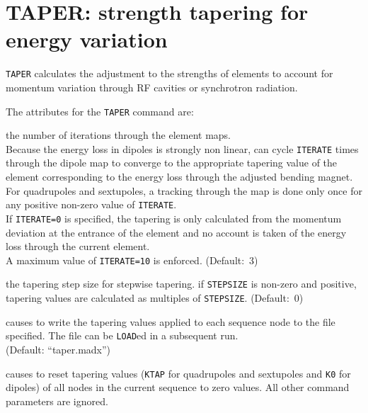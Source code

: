 
\chapter{TAPER: strength tapering for energy variation}
\label{chap:taper}

\texttt{TAPER} calculates the adjustment to the strengths of elements to
account for momentum variation through RF cavities or synchrotron
radiation. 


The attributes for the \texttt{TAPER} command are: 
\begin{madlist}
   the number of iterations through the element maps. \\
  Because the energy loss in dipoles is strongly non linear, \madx
  can cycle \texttt{ITERATE} times through the dipole map to converge to the 
  appropriate tapering value of the element corresponding to the energy
  loss through the adjusted bending magnet.  \\
  For quadrupoles and sextupoles, a tracking through the map is
  done only once for any positive non-zero value of
  \texttt{ITERATE}. \\  
  If \texttt{ITERATE=0} is specified, the tapering is only calculated
  from the momentum deviation at the entrance of the element and no
  account is taken of the energy loss through the current element. \\
  A maximum value of \texttt{ITERATE=10} is enforced. (Default:~3)
  
   the tapering step size for stepwise tapering. if
  \texttt{STEPSIZE} is non-zero and positive, tapering values are
  calculated as multiples of \texttt{STEPSIZE}. (Default:~0)  
  
   causes \madx to write the tapering values applied to
  each sequence node to the file specified. The file can be
  \texttt{LOAD}ed in a subsequent \madx run. \\
  (Default: ``taper.madx'') 

   causes \madx to reset tapering values (\texttt{KTAP} for
  quadrupoles and sextupoles and \texttt{K0} for dipoles) of all nodes
  in the current sequence to zero values. All other command parameters
  are ignored. 
  
\end{madlist}

